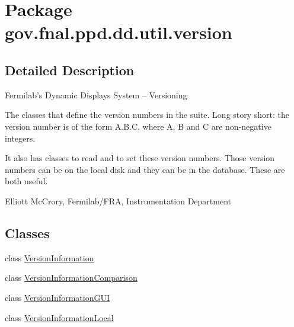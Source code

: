 \hypertarget{namespacegov_1_1fnal_1_1ppd_1_1dd_1_1util_1_1version}{\section{Package gov.\-fnal.\-ppd.\-dd.\-util.\-version}
\label{namespacegov_1_1fnal_1_1ppd_1_1dd_1_1util_1_1version}
}


\subsection{Detailed Description}
Fermilab's Dynamic Displays System -- Versioning 

The classes that define the version numbers in the suite. Long story short\-: the version number is of the form A.\-B.\-C, where A, B and C are non-\/negative integers. 

It also has classes to read and to set these version numbers. Those version numbers can be on the local disk and they can be in the database. These are both useful. 

Elliott Mc\-Crory, Fermilab/\-F\-R\-A, Instrumentation Department \subsection*{Classes}
\begin{DoxyCompactItemize}
\item 
class \hyperlink{classgov_1_1fnal_1_1ppd_1_1dd_1_1util_1_1version_1_1VersionInformation}{Version\-Information}
\item 
class \hyperlink{classgov_1_1fnal_1_1ppd_1_1dd_1_1util_1_1version_1_1VersionInformationComparison}{Version\-Information\-Comparison}
\item 
class \hyperlink{classgov_1_1fnal_1_1ppd_1_1dd_1_1util_1_1version_1_1VersionInformationGUI}{Version\-Information\-G\-U\-I}
\item 
class \hyperlink{classgov_1_1fnal_1_1ppd_1_1dd_1_1util_1_1version_1_1VersionInformationLocal}{Version\-Information\-Local}
\end{DoxyCompactItemize}
